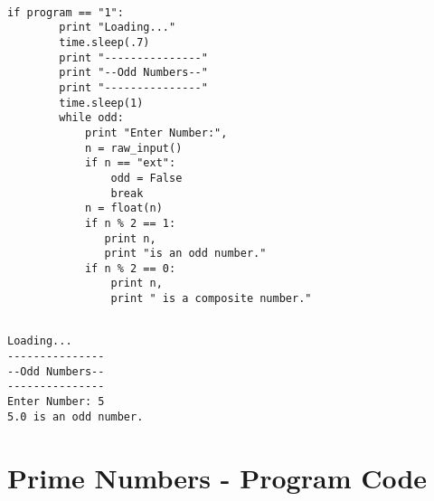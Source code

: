 \documentclass{tufte-handout}
\begin{document}
\begin{framed}
\begin{verbatim}

if program == "1":
        print "Loading..."
        time.sleep(.7)
        print "---------------"
        print "--Odd Numbers--"
        print "---------------"
        time.sleep(1)
        while odd:
            print "Enter Number:",
            n = raw_input()
            if n == "ext":
                odd = False
                break
            n = float(n)
            if n % 2 == 1:
               print n,
               print "is an odd number."
            if n % 2 == 0:
                print n,
                print " is a composite number."
                
\end{verbatim}
\end{framed}


\vspace{4.5cm}

\begin{shaded}
\begin{verbatim}
Loading...
---------------
--Odd Numbers--
---------------
Enter Number: 5
5.0 is an odd number.
\end{verbatim}
\end{shaded}

\vspace{1cm}

\newpage


\section{Prime Numbers - Program Code}
\end{document}
